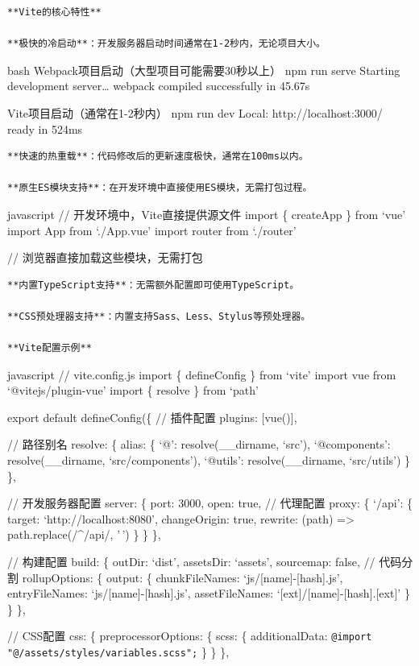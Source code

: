 {{\begin{lstlisting}
**Vite的核心特性**

**极快的冷启动**：开发服务器启动时间通常在1-2秒内，无论项目大小。
\end{lstlisting}

bash  Webpack项目启动（大型项目可能需要30秒以上） npm run serve  Starting development server\ldots{}  webpack compiled successfully in 45.67s

 Vite项目启动（通常在1-2秒内） npm run dev  Local: http://localhost:3000/  ready in 524ms

\begin{lstlisting}
**快速的热重载**：代码修改后的更新速度极快，通常在100ms以内。

**原生ES模块支持**：在开发环境中直接使用ES模块，无需打包过程。
\end{lstlisting}

javascript // 开发环境中，Vite直接提供源文件 import \{ createApp \} from `vue' import App from `./App.vue' import router from `./router'

// 浏览器直接加载这些模块，无需打包

\begin{lstlisting}
**内置TypeScript支持**：无需额外配置即可使用TypeScript。

**CSS预处理器支持**：内置支持Sass、Less、Stylus等预处理器。

**Vite配置示例**
\end{lstlisting}

javascript // vite.config.js import \{ defineConfig \} from `vite' import vue from `@vitejs/plugin-vue' import \{ resolve \} from `path'

export default defineConfig(\{ // 插件配置 plugins: {[}vue(){]},

// 路径别名 resolve: \{ alias: \{ `@': resolve(\_\_dirname, `src'), `@components': resolve(\_\_dirname, `src/components'), `@utils': resolve(\_\_dirname, `src/utils') \} \},

// 开发服务器配置 server: \{ port: 3000, open: true, // 代理配置 proxy: \{ `/api': \{ target: `http://localhost:8080', changeOrigin: true, rewrite: (path) =\textgreater{} path.replace(/\^{}/api/, '\,') \} \} \},

// 构建配置 build: \{ outDir: `dist', assetsDir: `assets', sourcemap: false, // 代码分割 rollupOptions: \{ output: \{ chunkFileNames: `js/{[}name{]}-{[}hash{]}.js', entryFileNames: `js/{[}name{]}-{[}hash{]}.js', assetFileNames: `{[}ext{]}/{[}name{]}-{[}hash{]}.{[}ext{]}' \} \} \},

// CSS配置 css: \{ preprocessorOptions: \{ scss: \{ additionalData: \texttt{@import "@/assets/styles/variables.scss";} \} \} \},

}}
